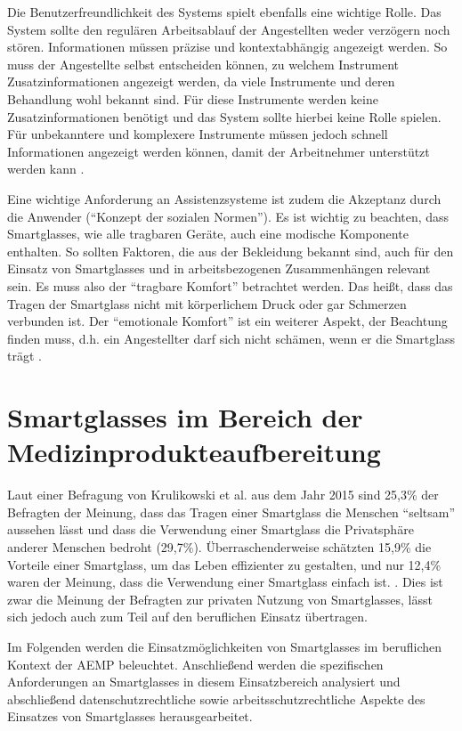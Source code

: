Die Benutzerfreundlichkeit des Systems spielt ebenfalls eine wichtige Rolle. Das System sollte den regulären Arbeitsablauf der Angestellten weder verzögern noch stören. Informationen müssen präzise und kontextabhängig angezeigt werden. So muss der Angestellte selbst entscheiden können, zu welchem Instrument Zusatzinformationen angezeigt werden, da viele Instrumente und deren Behandlung wohl bekannt sind. Für diese Instrumente werden keine Zusatzinformationen benötigt und das System sollte hierbei keine Rolle spielen. Für unbekanntere und komplexere Instrumente müssen jedoch schnell Informationen angezeigt werden können, damit der Arbeitnehmer unterstützt werden kann \cite[S.~29]{Ruther2014}.

Eine wichtige Anforderung an Assistenzsysteme ist zudem die Akzeptanz durch die Anwender (\enquote{Konzept der sozialen Normen}). Es ist wichtig zu beachten, dass Smartglasses, wie alle tragbaren Geräte, auch eine modische Komponente enthalten. So sollten Faktoren, die aus der Bekleidung bekannt sind, auch für den Einsatz von Smartglasses und in arbeitsbezogenen Zusammenhängen relevant sein. Es muss also der \enquote{tragbare Komfort} betrachtet werden. Das heißt, dass das Tragen der Smartglass nicht mit körperlichem Druck oder gar Schmerzen verbunden ist.  Der \enquote{emotionale Komfort} ist ein weiterer Aspekt, der Beachtung finden muss, d.h. ein Angestellter darf sich nicht schämen, wenn er die Smartglass trägt \cite{Hein2016}.
%
%
%
%
%
%
\section{Smartglasses im Bereich der Medizinprodukteaufbereitung}
\label{sec:Smartglasses_im_Bereich_der_Medizinprodukteaufbereitung}
Laut einer Befragung von Krulikowski et al. aus dem Jahr 2015 \cite{Hein2016} sind 25,3\% der Befragten der Meinung, dass das Tragen einer Smartglass die Menschen \enquote{seltsam} aussehen lässt und dass die Verwendung einer Smartglass die Privatsphäre anderer Menschen bedroht (29,7\%). Überraschenderweise schätzten 15,9\% die Vorteile einer Smartglass, um das Leben effizienter zu gestalten, und nur 12,4\% waren der Meinung, dass die Verwendung einer Smartglass einfach ist. \cite{Hein2016}. Dies ist zwar die Meinung der Befragten zur privaten Nutzung von Smartglasses, lässt sich jedoch auch zum Teil auf den beruflichen Einsatz übertragen.

Im Folgenden werden die Einsatzmöglichkeiten von Smartglasses im beruflichen Kontext der AEMP beleuchtet. Anschließend werden die spezifischen Anforderungen an Smartglasses in diesem Einsatzbereich analysiert und abschließend datenschutzrechtliche sowie arbeitsschutzrechtliche Aspekte des Einsatzes von Smartglasses herausgearbeitet. 
%
%
%
%
%
%
